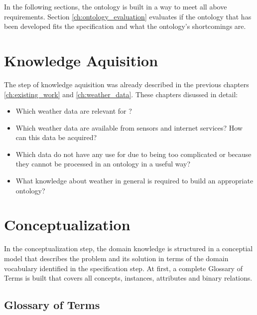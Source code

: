 \vspace{.5cm}

In the following sections, the \thinkhomeweather ontology is built in a way to meet all above requirements. Section \ref{ch:ontology_evaluation} evaluates if the ontology that has been developed fits the specification and what the ontology's shortcomings are.

\section{Knowledge Aquisition}

The step of knowledge aquisition was already described in the previous chapters \ref{ch:existing_work} and \ref{ch:weather_data}. These chapters disussed in detail:

\begin{itemize}
  \item Which weather data are relevant for \thinkhome?
  \item Which weather data are available from sensors and internet services? How can this data be acquired?
  \item Which data do not have any use for \thinkhomeweather due to being too complicated or because they cannot be processed in an ontology in a useful way?
  \item What knowledge about weather in general is required to build an appropriate ontology? %
\end{itemize}

\section{Conceptualization}

In the conceptualization step, the domain knowledge is structured in a conceptial model that describes the problem and its solution in terms of the domain vocabulary identified in the specification step. At first, a complete Glossary of Terms is built that covers all concepts, instances, attributes and binary relations.

\subsection{Glossary of Terms}

